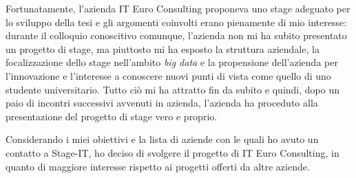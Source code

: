 Fortunatamente, l'azienda IT Euro Consulting proponeva uno stage adeguato per lo sviluppo della tesi e gli argomenti coinvolti erano pienamente di mio interesse: durante il colloquio conoscitivo comunque, l'azienda non mi ha subito presentato un progetto di stage, ma piuttosto mi ha esposto la struttura aziendale, la focalizzazione dello stage nell'ambito \textit{big data} e la propensione dell'azienda per l'innovazione e l'interesse a conoscere nuovi punti di vista come quello di uno studente universitario. Tutto ciò mi ha attratto fin da subito e quindi, dopo un paio di incontri successivi avvenuti in azienda, l'azienda ha proceduto alla presentazione del progetto di stage vero e proprio.

Considerando i miei obiettivi e la lista di aziende con le quali ho avuto un contatto a Stage-IT, ho deciso di svolgere il progetto di IT Euro Consulting, in quanto di maggiore interesse rispetto ai progetti offerti da altre aziende.

